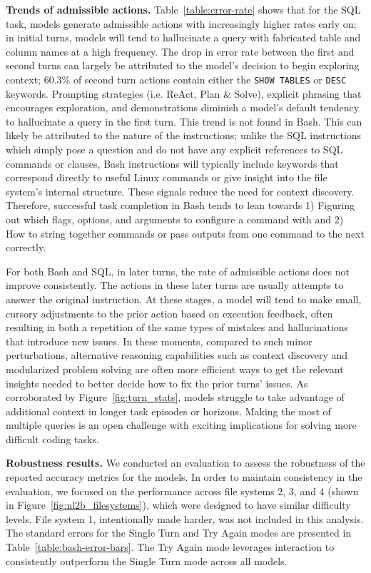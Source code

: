 \textbf{Trends of admissible actions.}
Table~\ref{table:error-rate} shows that for the SQL task, models generate admissible actions with increasingly higher rates early on; in initial turns, models will tend to hallucinate a query with fabricated table and column names at a high frequency. The drop in error rate between the first and second turns can largely be attributed to the model's decision to begin exploring context; $60.3\%$ of second turn actions contain either the \texttt{SHOW TABLES} or \texttt{DESC} keywords. Prompting strategies (i.e. ReAct, Plan \& Solve), explicit phrasing that encourages exploration, and demonstrations diminish a model's default tendency to hallucinate a query in the first turn. This trend is not found in Bash. This can likely be attributed to the nature of the instructions; unlike the SQL instructions which simply pose a question and do not have any explicit references to SQL commands or clauses, Bash instructions will typically include keywords that correspond directly to useful Linux commands or give insight into the file system's internal structure. These signals reduce the need for context discovery. Therefore, successful task completion in Bash tends to lean towards 1) Figuring out which flags, options, and arguments to configure a command with and 2) How to string together commands or pass outputs from one command to the next correctly.

For both Bash and SQL, in later turns, the rate of admissible actions does not improve consistently. The actions in these later turns are usually attempts to answer the original instruction.
At these stages, a model will tend to make small, cursory adjustments to the prior action based on execution feedback, often resulting in both a repetition of the same types of mistakes and hallucinations that introduce new issues.
In these moments, compared to such minor perturbations, alternative reasoning capabilities such as context discovery and modularized problem solving are often more efficient ways to get the relevant insights needed to better decide how to fix the prior turns' issues.
As corroborated by Figure~\ref{fig:turn_stats}, models struggle to take advantage of additional context in longer task episodes or horizons.
Making the most of multiple queries is an open challenge with exciting implications for solving more difficult coding tasks.



\textbf{Robustness results.}
We conducted an evaluation to assess the robustness of the reported accuracy metrics for the models. In order to maintain consistency in the evaluation, we focused on the performance across file systems 2, 3, and 4 (shown in Figure~\ref{fig:nl2b_filesystems}), which were designed to have similar difficulty levels. File system 1, intentionally made harder, was not included in this analysis.
The standard errors for the Single Turn and Try Again modes are presented in Table~\ref{table:bash-error-bars}. The Try Again mode leverages interaction to consistently outperform the Single Turn mode across all models.

